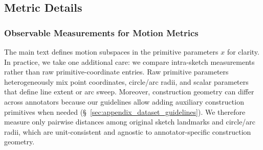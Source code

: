 \subsection{Metric Details}
\label{sec:appendix_metric_details}

\subsubsection{Observable Measurements for Motion Metrics}
\label{sec:appendix_observable_projection}
The main text defines motion subspaces in the primitive parameters $x$ for clarity. In practice, we take one additional care: we compare intra-sketch measurements rather than raw primitive-coordinate entries. Raw primitive parameters heterogeneously mix point coordinates, circle/arc radii, and scalar parameters that define line extent or arc sweep. Moreover, construction geometry can differ across annotators because our guidelines allow adding auxiliary construction primitives when needed (\S~\ref{sec:appendix_dataset_guidelines}). We therefore measure only pairwise distances among original sketch landmarks and circle/arc radii, which are unit-consistent and agnostic to annotator-specific construction geometry.

